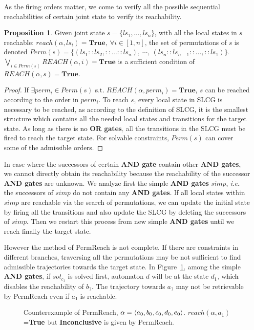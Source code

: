 \documentclass{article}
\theoremstyle{definition}
\newtheorem{proposition}{Proposition}
\DeclarePairedDelimiter{\init}{\langle}{\rangle}
\begin{document}
As the firing orders matter, we come to verify all the possible sequential reachabilities of certain joint state to verify its reachability.

\begin{proposition}\label{theoperm}
Given joint state $s=\{ls_1,\ldots,ls_n\}$, with all the local states in $s$ reachable: $reach(\alpha,ls_i)=\mathbf{True},\ \forall i\in[1,n]$, the set of permutations of $s$ is denoted $Perm(s)=\{(ls_1::ls_2,::\ldots ::ls_n),\ \cdots,\ (ls_n::ls_{n-1}::\ldots,::ls_1)\}$. $\bigvee_{i\in Perm(s)} REACH(\alpha,i)=\mathbf{True}$ is a sufficient condition of $REACH(\alpha,s)=\mathbf{True}$.
\end{proposition}
\begin{proof}
If $\exists perm_i\in Perm(s)$ s.t. $REACH(\alpha,perm_i)=\mathbf{True}$, $s$ can be reached according to the order in $perm_i$.
To reach $s$, every local state in SLCG is necessary to be reached, as according to the definition of SLCG, it is the smallest structure which contains all the needed local states and transitions for the target state. As long as there is no \textbf{OR gates}, all the transitions in the SLCG must be fired to reach the target state.
For solvable constraints, $Perm(s)$ can cover some of the admissible orders.
\end{proof}

In case where the successors of certain \textbf{AND gate} contain other \textbf{AND gates}, we cannot directly obtain its reachability because the reachability of the successor \textbf{AND gates} are unknown.
We analyze first the simple \textbf{AND gates} $simp$, \textit{i.e.} the successors of $simp$ do not contain any \textbf{AND gates}.
If all local states within $simp$ are reachable via the search of permutations, we can update the initial state by firing all the transitions and also update the SLCG by deleting the successors of $simp$. 
Then we restart this process from new simple \textbf{AND gates} until we reach finally the target state.

However the method of PermReach is not complete. 
If there are constraints in different branches, traversing all the permutations may be not sufficient to find admissible trajectories towards the target state.
In Figure~\ref{FigConflictInForks}, among the simple \textbf{AND gates}, if $sol_{c_1}$ is solved first, automaton $d$ will be at the state $d_1$, which disables the reachability of $b_1$.
The trajectory towards $a_1$ may not be retrievable by PermReach even if $a_1$ is reachable.
\begin{figure}[ht]
\centering

\caption{Counterexample of PermReach, $\alpha=\init{ a_0,b_0,c_0,d_0,e_0}$. 
$reach(\alpha,a_1)$=\textbf{True} but \textbf{Inconclusive} is given by PermReach.
}\label{FigConflictInForks}
\end{figure}
\end{document}
